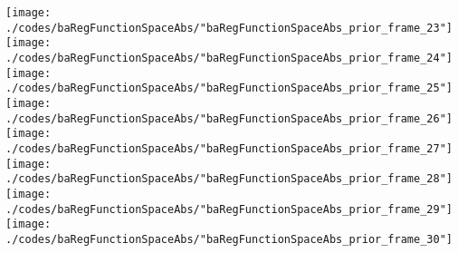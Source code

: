 \begin{frame}{\insertsection}
\begin{center}
{\begin{animateinline}{20}
				 \texttt{[image: ./codes/baRegFunctionSpaceAbs/"baRegFunctionSpaceAbs\_prior\_frame\_23"]}\newframe
				 \texttt{[image: ./codes/baRegFunctionSpaceAbs/"baRegFunctionSpaceAbs\_prior\_frame\_24"]}\newframe
				 \texttt{[image: ./codes/baRegFunctionSpaceAbs/"baRegFunctionSpaceAbs\_prior\_frame\_25"]}\newframe
				 \texttt{[image: ./codes/baRegFunctionSpaceAbs/"baRegFunctionSpaceAbs\_prior\_frame\_26"]}\newframe
				 \texttt{[image: ./codes/baRegFunctionSpaceAbs/"baRegFunctionSpaceAbs\_prior\_frame\_27"]}\newframe
				 \texttt{[image: ./codes/baRegFunctionSpaceAbs/"baRegFunctionSpaceAbs\_prior\_frame\_28"]}\newframe
				 \texttt{[image: ./codes/baRegFunctionSpaceAbs/"baRegFunctionSpaceAbs\_prior\_frame\_29"]}\newframe
				 \texttt{[image: ./codes/baRegFunctionSpaceAbs/"baRegFunctionSpaceAbs\_prior\_frame\_30"]}
			 \end{animateinline}
			}
	\end{center}
    
\end{frame}

